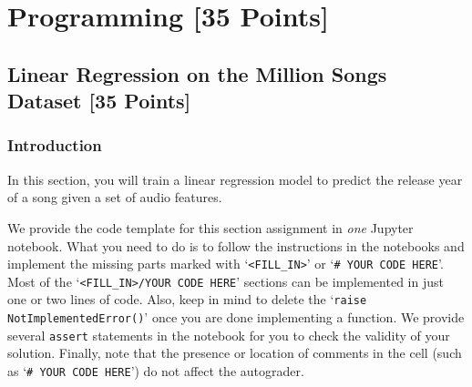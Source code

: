 \setlength\parindent{0pt}
\setlength{\parskip}{\baselineskip}

\section{Programming [35 Points]}

\subsection{Linear Regression on the Million Songs Dataset [35 Points]}

\subsubsection{Introduction}
In this section, you will train a linear regression model to predict the release year of a song given a set of audio features.

We provide the code template for this section assignment in \textit{one} Jupyter notebook. What you need to do is to follow the instructions in the notebooks and implement the missing parts marked with `\texttt{<FILL\_IN>}' or `\texttt{\# YOUR CODE HERE}'. Most of the `\texttt{<FILL\_IN>/YOUR CODE HERE}' sections can be implemented in just one or two lines of code. Also, keep in mind to delete the `\texttt{raise NotImplementedError()}' once you are done implementing a function. We provide several \texttt{assert} statements in the notebook for you to check the validity of your solution. Finally, note that the presence or location of comments in the cell (such as `\texttt{\# YOUR CODE HERE}') do not affect the autograder.

